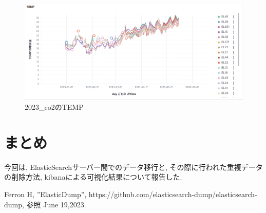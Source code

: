 \documentclass[a4j,12pt,]{jarticle}
\begin{document}
\begin{figure}[H]
  \begin{center}
    \includegraphics[width=160mm]{2023_temp.png}
    \caption{2023\_co2のTEMP}
    \label{p6}
  \end{center}
\end{figure}

\section{まとめ}
今回は, ElasticSearchサーバー間でのデータ移行と, その際に行われた重複データの削除方法, kibanaによる可視化結果について報告した.

\begin{thebibliography}{5}
  Ferron H, ”ElasticDump”, https://github.com/elasticsearch-dump/elasticsearch-dump, 参照 June 19,2023.
\end{thebibliography}
\end{document}
